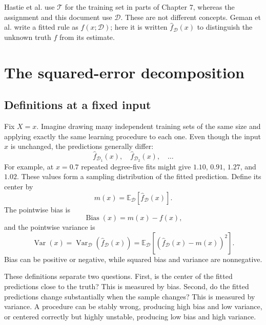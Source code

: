 \documentclass[11pt,a4paper]{article}
\newcommand{\ED}{\mathbb{E}_{\mathcal D}}
\newcommand{\VarD}{\operatorname{Var}_{\mathcal D}}
\begin{document}
Hastie et al. use $\mathcal T$ for the training set in parts of Chapter 7, whereas the assignment and this document use $\mathcal D$. These are not different concepts. Geman et al. write a fitted rule as $f(x;\mathcal D)$; here it is written $\widehat f_{\mathcal D}(x)$ to distinguish the unknown truth $f$ from its estimate.

\section{The squared-error decomposition}
\label{sec:decomposition}

\subsection{Definitions at a fixed input}

Fix $X=x$. Imagine drawing many independent training sets of the same size and applying exactly the same learning procedure to each one. Even though the input $x$ is unchanged, the predictions generally differ:
\begin{equation*}
  \widehat f_{\mathcal D_1}(x),\quad
  \widehat f_{\mathcal D_2}(x),\quad\ldots
\end{equation*}
For example, at $x=0.7$ repeated degree-five fits might give $1.10$, $0.91$, $1.27$, and $1.02$. These values form a sampling distribution of the fitted prediction. Define its center by
\begin{equation}
  m(x)=\ED\left[\widehat f_{\mathcal D}(x)\right].
\end{equation}
The pointwise bias is
\begin{equation}
  \operatorname{Bias}(x)
  =m(x)-f(x),
\end{equation}
and the pointwise variance is
\begin{equation}
  \operatorname{Var}(x)
  =\VarD\left(\widehat f_{\mathcal D}(x)\right)
  =\ED\left[\left(\widehat f_{\mathcal D}(x)-m(x)\right)^2\right].
\end{equation}
Bias can be positive or negative, while squared bias and variance are nonnegative.

These definitions separate two questions. First, is the center of the fitted predictions close to the truth? This is measured by bias. Second, do the fitted predictions change substantially when the sample changes? This is measured by variance. A procedure can be stably wrong, producing high bias and low variance, or centered correctly but highly unstable, producing low bias and high variance.
\end{document}
